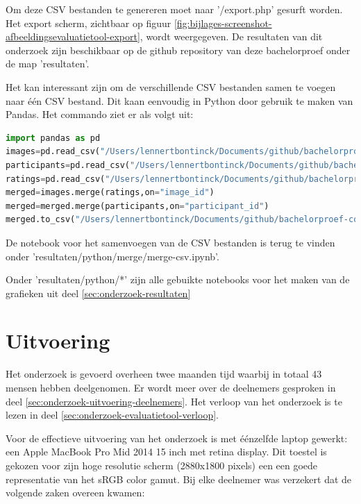 Om deze CSV bestanden te genereren moet naar '/export.php' gesurft worden. Het export scherm, zichtbaar op figuur \ref{fig:bijlages-screenshot-afbeeldingsevaluatietool-export}, wordt weergegeven. De resultaten van dit onderzoek zijn beschikbaar op de \gls{github} repository van deze bachelorproef onder de map 'resultaten'.

Het kan interessant zijn om de verschillende CSV bestanden samen te voegen naar één CSV bestand. Dit kaan eenvoudig in Python door gebruik te maken van Pandas. Het commando ziet er als volgt uit:

\begin{lstlisting}[language=Python]
import pandas as pd
images=pd.read_csv("/Users/lennertbontinck/Documents/github/bachelorproef-compressie/resultaten/csv/images.csv")
participants=pd.read_csv("/Users/lennertbontinck/Documents/github/bachelorproef-compressie/resultaten/csv/participants.csv")
ratings=pd.read_csv("/Users/lennertbontinck/Documents/github/bachelorproef-compressie/resultaten/csv/ratings.csv")
merged=images.merge(ratings,on="image_id")
merged=merged.merge(participants,on="participant_id")
merged.to_csv("/Users/lennertbontinck/Documents/github/bachelorproef-compressie/resultaten/csv/merged.csv", index=False)
\end{lstlisting}

De notebook voor het samenvoegen van de CSV bestanden is terug te vinden onder 'resultaten/python/merge/merge-csv.ipynb'.

Onder 'resultaten/python/*' zijn alle gebuikte notebooks voor het maken van de grafieken uit deel \ref{sec:onderzoek-resultaten}

\section{Uitvoering}
\label{sec:onderzoek-uitvoering}

Het onderzoek is gevoerd overheen twee maanden tijd waarbij in totaal 43 mensen hebben deelgenomen. Er wordt meer over de deelnemers gesproken in deel \ref{sec:onderzoek-uitvoering-deelnemers}. Het verloop van het onderzoek is te lezen in deel \ref{sec:onderzoek-evaluatietool-verloop}.

Voor de effectieve uitvoering van het onderzoek is met éénzelfde laptop gewerkt: een Apple MacBook Pro Mid 2014 15 inch met retina display. Dit toestel is gekozen voor zijn hoge resolutie scherm (2880x1800 \glspl{pixel}) een een goede representatie van het  sRGB color gamut. Bij elke deelnemer was verzekert dat de volgende zaken overeen kwamen:

